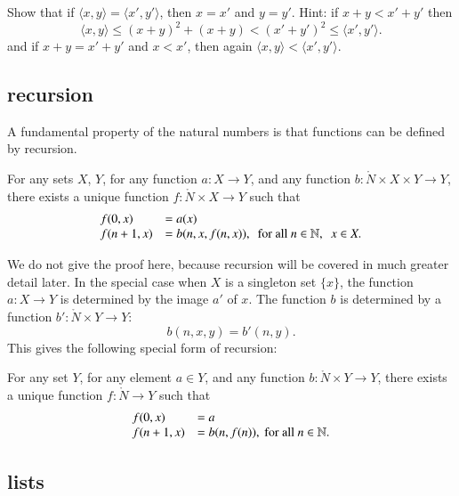 \begin{exer} Show that if $\langle x,y\rangle = \langle x',y'\rangle$, then $x=x'$ and $y=y'$.
Hint: if $x+y < x'+y'$ then 
$$
\langle x,y\rangle\le (x+y)^2+(x+y) < (x'+y')^2 \le \langle x',y'\rangle.
$$
and if $x+y=x'+y'$ and $x<x'$, then again $\langle x,y\rangle < \langle x',y'\rangle$.
\end{exer}



\subsection{recursion}

A fundamental property of the natural numbers is that functions can be
defined by recursion.


\begin{assert}[recursion]  For any sets $X$, $Y$, for any function $a:X\to Y$, and any function $b:\ring{N}\times X\times Y\to Y$, there exists a unique function $f:\ring{N}\times X\to Y$ such that
$$
\begin{array}{lll}
f(0,x) &= a(x)\\
f(n+1,x) &= b(n,x,f(n,x)),~\hbox{ for all } n\in\mathbb{N},~~ x\in X.
\end{array}
$$
\end{assert}

We do not give the proof here, because recursion will be covered in much greater detail later.  In the special case when $X$ is a singleton set $\{x\}$, the function $a:X\to Y$ is determined by the image $a'$ of $x$.  The function $b$ is determined by a function $b':\ring{N}\times Y\to Y$:
$$
b(n,x,y) = b'(n,y).
$$
This gives the following special form of recursion:

\begin{assert}  For any set $Y$, for any element $a\in Y$, and any function $b:\ring{N}\times Y\to Y$, there exists a unique function $f:\ring{N}\to Y$ such that
$$
\begin{array}{lll}
f(0,x) &= a\\
f(n+1,x) &= b(n,f(n)),\hbox{ for all } n\in\mathbb{N}.
\end{array}
$$
\end{assert}



\subsection{lists}


